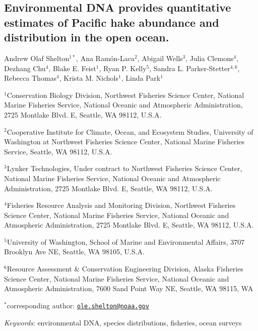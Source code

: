 \documentclass[
]{article}
\author{}
\date{\vspace{-2.5em}}
\begin{document}
\hypertarget{environmental-dna-provides-quantitative-estimates-of-abundance-and-distribution-in-the-open-ocean.}{%
\subsection{Environmental DNA provides quantitative estimates of Pacific hake
abundance and distribution in the open ocean.}\label{environmental-dna-provides-quantitative-estimates-of-abundance-and-distribution-in-the-open-ocean.}}

Andrew Olaf Shelton\(^{1*}\), Ana Ram\'on-Laca\(^2\), Abigail
Wells\(^3\), Julia Clemons\(^{4}\), Dezhang Chu\(^{4}\), Blake E.
Feist\(^1\), Ryan P. Kelly\(^{5}\), Sandra L. Parker-Stetter\(^{4,6}\),
Rebecca Thomas\(^{4}\), Krista M. Nichols\(^1\), Linda Park\(^1\)

\(^1\)Conservation Biology Division, Northwest Fisheries Science Center,
National Marine Fisheries Service, National Oceanic and Atmospheric
Administration, 2725 Montlake Blvd. E, Seattle, WA 98112, U.S.A.

\(^2\)Cooperative Institute for Climate, Ocean, and Ecosystem Studies, University of Washington at Northwest Fisheries Science
Center, National Marine Fisheries Service, Seattle, WA 98112, U.S.A.

\(^3\)Lynker Technologies, Under contract to Northwest Fisheries Science
Center, National Marine Fisheries Service, National Oceanic and
Atmospheric Administration, 2725 Montlake Blvd. E, Seattle, WA 98112,
U.S.A.

\(^{4}\)Fisheries Resource Analysis and Monitoring Division, Northwest
Fisheries Science Center, National Marine Fisheries Service, National
Oceanic and Atmospheric Administration, 2725 Montlake Blvd. E, Seattle,
WA 98112, U.S.A.

\(^{5}\)University of Washington, School of Marine and Environmental
Affairs, 3707 Brooklyn Ave NE, Seattle, WA 98105, U.S.A.

\(^{6}\)Resource Assessment \& Conservation Engineering Division, Alaska
Fisheries Science Center, National Marine Fisheries Service, National
Oceanic and Atmospheric Administration, 7600 Sand Point Way NE, Seattle,
WA 98115, WA

\(^{*}\)corresponding author:
\href{mailto:ole.shelton@noaa.gov}{\nolinkurl{ole.shelton@noaa.gov}}

\emph{Keywords}: environmental DNA, species distributions, fisheries, ocean surveys

\pagebreak
\end{document}
